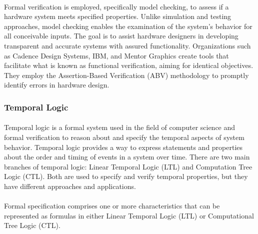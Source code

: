 \paragraph*{}
Formal verification is employed, specifically model checking, to assess if a hardware system meets specified properties. Unlike simulation and testing approaches, model checking enables the examination of the system's behavior for all conceivable inputs. The goal is to assist hardware designers in developing transparent and accurate systems with assured functionality. Organizations such as Cadence Design Systems, IBM, and Mentor Graphics create tools that facilitate what is known as functional verification, aiming for identical objectives. They employ the Assertion-Based Verification (ABV) methodology to promptly identify errors in hardware design.
\paragraph*{}
\subsubsection{Temporal Logic}
\paragraph*{}
Temporal logic is a formal system used in the field of computer science and formal verification to reason about and specify the temporal aspects of system behavior. Temporal logic provides a way to express statements and properties about the order and timing of events in a system over time. There are two main branches of temporal logic: Linear Temporal Logic (LTL) and Computation Tree Logic (CTL). Both are used to specify and verify temporal properties, but they have different approaches and applications.
\paragraph*{}
Formal specification comprises one or more characteristics that can be represented as formulas in either Linear Temporal Logic (LTL) or Computational Tree Logic (CTL).

